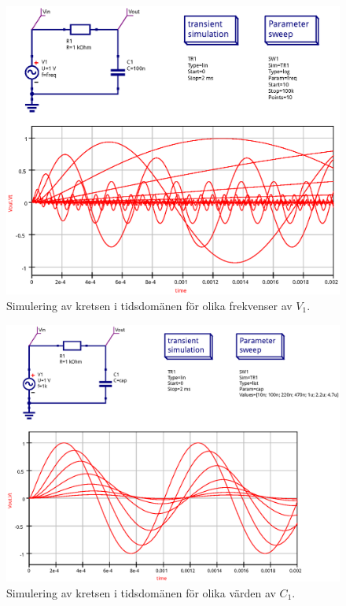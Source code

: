 \begin{figure}[ht]\label{fig:bode-sim-tran}
  \centering
  \includegraphics[width=\linewidth]{sim/ee466_lab-4_prj/uppgift-1_tran}
  \caption[] {Simulering av kretsen i tidsdomänen för olika frekvenser av $V_1$.}
\end{figure}

\begin{figure}[ht]\label{fig:bode-sim-param}
  \centering
  \includegraphics[width=\linewidth]{sim/ee466_lab-4_prj/uppgift-1_param}
  \caption[] {Simulering av kretsen i tidsdomänen för olika värden av $C_1$.}
\end{figure}


